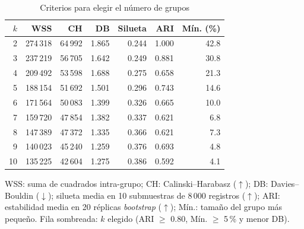 \begin{table}[!htb]
\centering
\caption{Criterios para elegir el número de grupos}
\label{tab:seleccionk}
\footnotesize
\setlength{\tabcolsep}{3.2pt}
\begin{tabular}{@{}rrrrrrr@{}}
\toprule
$k$ & WSS & CH & DB & Silueta & ARI & Mín. (\%) \\
\midrule
2 & 274\,318 & 64\,992 & 1.865 & 0.244 & 1.000 & 42.8 \\
\rowcolor{SelRow}3 & 237\,219 & 56\,705 & 1.642 & 0.249 & 0.881 & 30.8 \\
4 & 209\,492 & 53\,598 & 1.688 & 0.275 & 0.658 & 21.3 \\
5 & 188\,154 & 51\,692 & 1.501 & 0.296 & 0.743 & 14.6 \\
6 & 171\,564 & 50\,083 & 1.399 & 0.326 & 0.665 & 10.0 \\
7 & 159\,720 & 47\,854 & 1.382 & 0.337 & 0.621 & 6.8 \\
8 & 147\,389 & 47\,372 & 1.335 & 0.366 & 0.621 & 7.3 \\
9 & 140\,023 & 45\,240 & 1.259 & 0.376 & 0.693 & 4.8 \\
10 & 135\,225 & 42\,604 & 1.275 & 0.386 & 0.592 & 4.1 \\
\bottomrule
\end{tabular}
\par\smallskip\parbox{\columnwidth}{\scriptsize WSS: suma de cuadrados intra-grupo; CH: Calinski--Harabasz ($\uparrow$); DB: Davies--Bouldin ($\downarrow$); silueta media en 10 submuestras de 8\,000 registros ($\uparrow$); ARI: estabilidad media en 20 réplicas \textit{bootstrap} ($\uparrow$); Mín.: tamaño del grupo más pequeño. Fila sombreada: $k$ elegido (ARI $\geq$ 0.80, Mín. $\geq$ 5\,\% y menor DB).}
\end{table}
